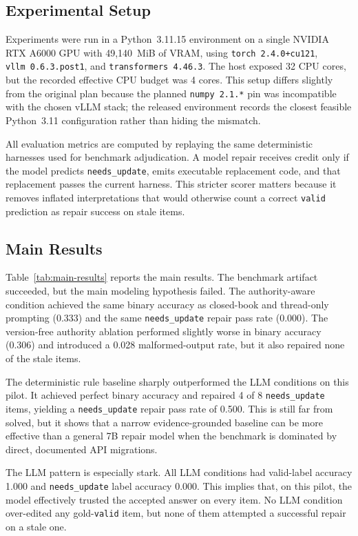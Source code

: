 \documentclass{article}
\newcommand{\valid}{\texttt{valid}}
\newcommand{\needsupdate}{\texttt{needs\_update}}
\begin{document}
\subsection{Experimental Setup}

Experiments were run in a Python~3.11.15 environment on a single NVIDIA RTX A6000 GPU with 49{,}140~MiB of VRAM, using \texttt{torch~2.4.0+cu121}, \texttt{vllm~0.6.3.post1}, and \texttt{transformers~4.46.3}. The host exposed 32 CPU cores, but the recorded effective CPU budget was 4 cores. This setup differs slightly from the original plan because the planned \texttt{numpy~2.1.*} pin was incompatible with the chosen vLLM stack; the released environment records the closest feasible Python~3.11 configuration rather than hiding the mismatch.

All evaluation metrics are computed by replaying the same deterministic harnesses used for benchmark adjudication. A model repair receives credit only if the model predicts \needsupdate{}, emits executable replacement code, and that replacement passes the current harness. This stricter scorer matters because it removes inflated interpretations that would otherwise count a correct \valid{} prediction as repair success on stale items.

\subsection{Main Results}

Table~\ref{tab:main-results} reports the main results. The benchmark artifact succeeded, but the main modeling hypothesis failed. The authority-aware condition achieved the same binary accuracy as closed-book and thread-only prompting (0.333) and the same \needsupdate{} repair pass rate (0.000). The version-free authority ablation performed slightly worse in binary accuracy (0.306) and introduced a 0.028 malformed-output rate, but it also repaired none of the stale items.

The deterministic rule baseline sharply outperformed the LLM conditions on this pilot. It achieved perfect binary accuracy and repaired 4 of 8 \needsupdate{} items, yielding a \needsupdate{} repair pass rate of 0.500. This is still far from solved, but it shows that a narrow evidence-grounded baseline can be more effective than a general 7B repair model when the benchmark is dominated by direct, documented API migrations.

The LLM pattern is especially stark. All LLM conditions had valid-label accuracy 1.000 and \needsupdate{} label accuracy 0.000. This implies that, on this pilot, the model effectively trusted the accepted answer on every item. No LLM condition over-edited any gold-\valid{} item, but none of them attempted a successful repair on a stale one.
\end{document}
